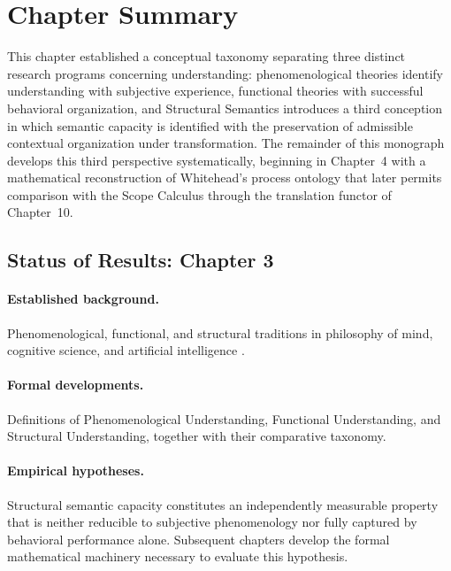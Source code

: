 \documentclass[11pt,twoside,openright]{book}
\numberwithin{equation}{chapter}
\theoremstyle{definition}
\theoremstyle{plain}
\theoremstyle{remark}
\theoremstyle{definition}
\begin{document}
\section{Chapter Summary}

This chapter established a conceptual taxonomy separating three distinct
research programs concerning understanding: phenomenological theories
identify understanding with subjective experience, functional theories
with successful behavioral organization, and Structural Semantics
introduces a third conception in which semantic capacity is identified
with the preservation of admissible contextual organization under
transformation. The remainder of this monograph develops this third
perspective systematically, beginning in Chapter~4 with a mathematical
reconstruction of Whitehead's process ontology that later permits
comparison with the Scope Calculus through the translation functor of
Chapter~10.

\subsection*{Status of Results: Chapter 3}

\paragraph{Established background.} Phenomenological, functional, and
structural traditions in philosophy of mind, cognitive science, and
artificial intelligence \cite{Turing1950,Searle1980,Block1995,
Whitehead1929}.

\paragraph{Formal developments.} Definitions of Phenomenological
Understanding, Functional Understanding, and Structural Understanding,
together with their comparative taxonomy.

\paragraph{Empirical hypotheses.} Structural semantic capacity
constitutes an independently measurable property that is neither
reducible to subjective phenomenology nor fully captured by behavioral
performance alone. Subsequent chapters develop the formal mathematical
machinery necessary to evaluate this hypothesis.

\end{document}
